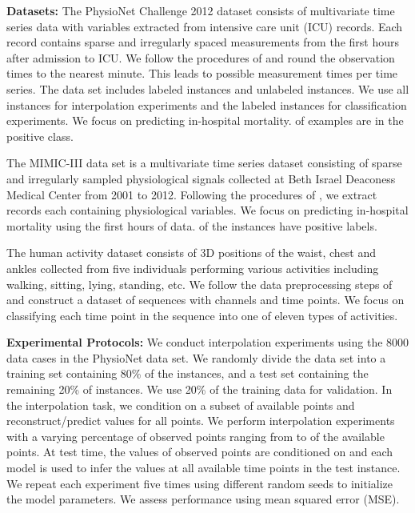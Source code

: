 \documentclass{article} \usepackage{iclr2021_conference,times}
\begin{document}
\textbf{Datasets:} The PhysioNet Challenge 2012 dataset \citep{physionet} consists of multivariate time series data with  variables extracted from intensive care unit (ICU) records. Each record contains sparse and irregularly spaced measurements from the first  hours after admission to ICU. We follow the procedures of \citet{Rubanova2019} and round the observation times to the nearest minute. This leads to  possible measurement times per time series. The data set includes  labeled instances and  unlabeled instances.  We use all  instances for interpolation experiments and the  labeled instances for classification experiments. We focus on predicting in-hospital mortality.  of examples are in the positive class.

The MIMIC-III data set \citep{johnson2016mimic} is a multivariate time series dataset consisting of sparse and irregularly sampled physiological signals collected at Beth Israel Deaconess Medical Center from 2001 to 2012. Following the procedures  of \citet{shukla2019}, we extract  records each containing  physiological variables. We focus on predicting in-hospital mortality using the first  hours of data.  of the instances have positive labels.


The human activity dataset consists of 3D positions of the waist, chest and ankles collected from five individuals performing various activities including walking, sitting, lying, standing, etc. We follow the data preprocessing steps of \citet{Rubanova2019} and construct a dataset of  sequences with  channels and  time points.  We focus on classifying each time point in the sequence into one of eleven types of activities. 





\textbf{Experimental Protocols:} 
We conduct interpolation experiments using the 8000 data cases in the PhysioNet data set. We randomly divide the data set into a training set containing 80\% of the instances, and a test set containing the remaining 20\% of instances. We use 20\% of the training data for validation.
In the interpolation task, we condition on a subset of available points and reconstruct/predict values for all points. We perform interpolation experiments with a varying percentage of observed points ranging from  to  of the available points. At test time, the values of observed points are conditioned on and each model is used to infer the values at all available time points in the test instance. We repeat each experiment five times using different random seeds to initialize the model parameters. We assess performance using mean squared error (MSE).
\end{document}
